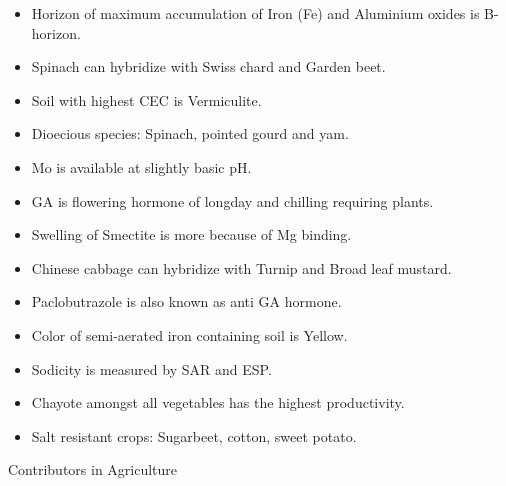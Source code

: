 \documentclass[
  openany]{book}
\begin{document}
\begin{itemize}
\item
  Horizon of maximum accumulation of Iron (Fe) and Aluminium oxides is B-horizon.
\item
  Spinach can hybridize with Swiss chard and Garden beet.
\item
  Soil with highest CEC is Vermiculite.
\item
  Dioecious species: Spinach, pointed gourd and yam.
\item
  Mo is available at slightly basic pH.
\item
  GA is flowering hormone of longday and chilling requiring plants.
\item
  Swelling of Smectite is more because of Mg binding.
\item
  Chinese cabbage can hybridize with Turnip and Broad leaf mustard.
\item
  Paclobutrazole is also known as anti GA hormone.
\item
  Color of semi-aerated iron containing soil is Yellow.
\item
  Sodicity is measured by SAR and ESP.
\item
  Chayote amongst all vegetables has the highest productivity.
\item
  Salt resistant crops: Sugarbeet, cotton, sweet potato.
\end{itemize}

Contributors in Agriculture
\end{document}
